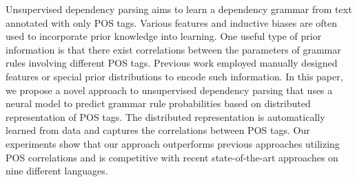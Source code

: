 Unsupervised dependency parsing aims to learn a dependency grammar from text annotated with only POS tags. Various features and inductive biases are often used to incorporate prior knowledge into learning. One useful type of prior information is that there exist correlations between the parameters of grammar rules involving different POS tags. Previous work employed manually designed features or special prior distributions to encode such information. In this paper, we propose a novel approach to unsupervised dependency parsing that uses a neural model to predict grammar rule probabilities based on distributed representation of POS tags. The distributed representation is automatically learned from data and captures the correlations between POS tags. Our experiments show that our approach outperforms previous approaches utilizing POS correlations and is competitive with recent state-of-the-art approaches on nine different languages.
